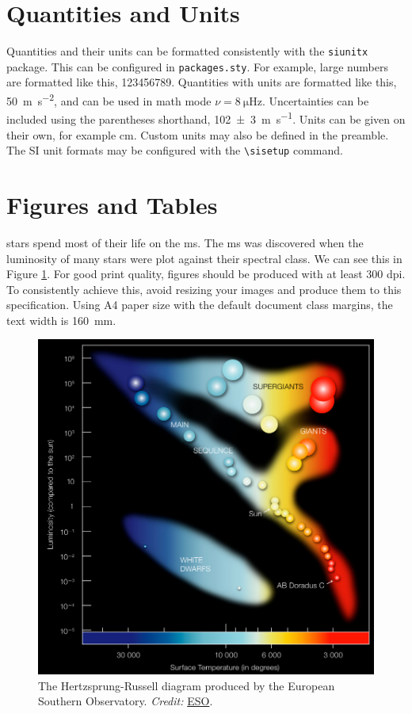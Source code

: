 \section{Quantities and Units}

Quantities and their units can be formatted consistently with the \texttt{siunitx} package. This can be configured in \texttt{packages.sty}. For example, large numbers are formatted like this, \num{123456789}. Quantities with units are formatted like this, \SI{50}{\meter\per\second\squared}, and can be used in math mode $\nu = \SI{8}{\micro\hertz}$. Uncertainties can be included using the parentheses shorthand, \SI{102(3)}{\meter\per\second}. Units can be given on their own, for example \si{\centi\meter}. Custom units may also be defined in the preamble. The SI unit formats may be configured with the \texttt{\textbackslash sisetup} command.

\section{Figures and Tables}\label{sec:figandtab}

\Glspl{star} spend most of their life on the \acrfull{ms}. The \acrshort{ms} was discovered when the \gls{luminosity} of many stars were plot against their spectral class. We can see this in Figure \ref{fig:example}. For good print quality, figures should be produced with at least 300 \acrfull{dpi}. To consistently achieve this, avoid resizing your images and produce them to this specification. Using A4 paper size with the default document class margins, the text width is \SI{160}{\milli\meter}.

\begin{figure}[t]
  \centering
  \includegraphics{figures/example.pdf}
  \caption[Short version of caption]{The Hertzsprung-Russell diagram produced by the European Southern Observatory. \emph{Credit:} \href{https://www.eso.org/public/images/eso0728c/}{ESO}.}
  \label{fig:example}
\end{figure}

